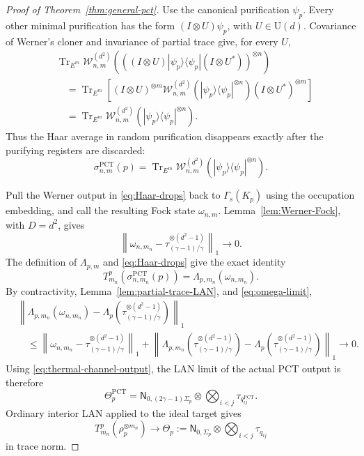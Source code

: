 \documentclass[11pt]{article}
\theoremstyle{remark}
\theoremstyle{plain}
\newcommand{\U}{\mathrm U}
\newcommand{\Tr}{\operatorname{Tr}}
\newcommand{\proj}[1]{|#1\rangle\!\langle #1|}
\newcommand{\ot}{\otimes}
\begin{document}
\begin{proof}[Proof of Theorem~\ref{thm:general-pct}]
Use the canonical purification \(\psi_p\).  Every other minimal purification
has the form \((I\ot U)\psi_p\), with \(U\in\U(d)\).  Covariance of Werner's
cloner and invariance of partial trace give, for every \(U\),
\begin{align*}
 &\Tr_{E^m}\mathcal W_{n,m}^{(d^2)}\!\left(
   ((I\ot U)\proj{\psi_p}(I\ot U^*))^{\ot n}
 \right)\\
 &\quad=\Tr_{E^m}\!\left[
   (I\ot U)^{\ot m}
   \mathcal W_{n,m}^{(d^2)}(\proj{\psi_p}^{\ot n})
   (I\ot U^*)^{\ot m}
 \right]\\
 &\quad=\Tr_{E^m}
   \mathcal W_{n,m}^{(d^2)}(\proj{\psi_p}^{\ot n}).
\end{align*}
Thus the Haar average in random purification disappears exactly after the
purifying registers are discarded:
\begin{equation}\label{eq:Haar-drops}
  \sigma_{n,m}^{\mathrm{PCT}}(p)
  =\Tr_{E^m}
   \mathcal W_{n,m}^{(d^2)}(\proj{\psi_p}^{\ot n}).
\end{equation}

Pull the Werner output in \eqref{eq:Haar-drops} back to
\(\Gamma_s(K_p)\) using the occupation embedding, and call the resulting
Fock state \(\omega_{n,m}\).  Lemma~\ref{lem:Werner-Fock}, with
\(D=d^2\), gives
\begin{equation}\label{eq:omega-limit}
  \left\|
    \omega_{n,m_n}
    -\tau_{(\gamma-1)/\gamma}^{\ot(d^2-1)}
  \right\|_1\longrightarrow0.
\end{equation}
The definition of \(\Lambda_{p,m}\) and \eqref{eq:Haar-drops} give the exact
identity
\[
  T_{m_n}^p(\sigma_{n,m_n}^{\mathrm{PCT}}(p))
  =\Lambda_{p,m_n}(\omega_{n,m_n}).
\]
By contractivity, Lemma~\ref{lem:partial-trace-LAN}, and
\eqref{eq:omega-limit},
\begin{align*}
 &\left\|
  \Lambda_{p,m_n}(\omega_{n,m_n})
  -\Lambda_p\!\left(
    \tau_{(\gamma-1)/\gamma}^{\ot(d^2-1)}
  \right)
 \right\|_1\\
 &\quad\le
 \left\|
   \omega_{n,m_n}
   -\tau_{(\gamma-1)/\gamma}^{\ot(d^2-1)}
 \right\|_1
 +\left\|
   \Lambda_{p,m_n}\!\left(
     \tau_{(\gamma-1)/\gamma}^{\ot(d^2-1)}
   \right)
   -\Lambda_p\!\left(
     \tau_{(\gamma-1)/\gamma}^{\ot(d^2-1)}
   \right)
 \right\|_1
 \longrightarrow0.
\end{align*}
Using \eqref{eq:thermal-channel-output}, the LAN limit of the actual PCT
output is therefore
\begin{equation}\label{eq:PCT-LAN-output}
  \Theta_p^{\mathrm{PCT}}
  =\mathsf N_{0,(2\gamma-1)\Sigma_p}
   \ot\bigotimes_{i<j}\tau_{q_{ij}^{\mathrm{PCT}}}.
\end{equation}
Ordinary interior LAN applied to the ideal target gives
\begin{equation}\label{eq:target-LAN-output}
  T_{m_n}^p(\rho_p^{\ot m_n})
  \longrightarrow
  \Theta_p
  :=\mathsf N_{0,\Sigma_p}
    \ot\bigotimes_{i<j}\tau_{q_{ij}}
\end{equation}
in trace norm.


\end{proof}
\end{document}
